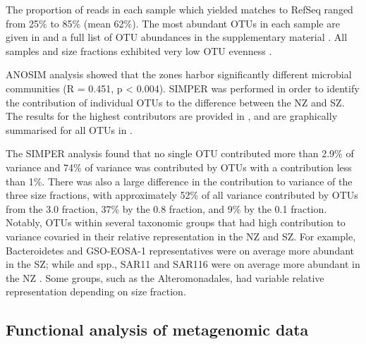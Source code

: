 The proportion of reads in each sample which yielded matches to RefSeq ranged from 25\% to 85\% (mean 62\%).
The most abundant \acp{OTU} in each sample are given in  and a full list of \ac{OTU} abundances in the supplementary material .
All samples and size fractions exhibited very low \ac{OTU} evenness .




\ac{ANOSIM} analysis showed that the zones harbor significantly different microbial communities (R = 0.451, p < 0.004). 
\ac{SIMPER} was performed in order to identify the contribution of individual \acp{OTU} to the difference between the \ac{NZ} and \ac{SZ}. 
The results for the highest contributors are provided in , and are graphically summarised for all \acp{OTU} in .




The \ac{SIMPER} analysis found that no single \ac{OTU} contributed more than 2.9\% of variance and 74\% of variance was contributed by \acp{OTU} with a contribution less than 1\%. 
There was also a large difference in the contribution to variance of the three size fractions, with approximately 52\% of all variance contributed by \acp{OTU} from the 3.0 \micron{} fraction, 37\% by the 0.8 \micron{} fraction, and 9\% by the 0.1 \micron{} fraction.
Notably, \acp{OTU} within several taxonomic groups that had high contribution to variance covaried in their relative representation in the \ac{NZ} and \ac{SZ}.
For example, Bacteroidetes and GSO-EOSA-1 representatives were on average more abundant in the \ac{SZ}; while  and  spp., SAR11 and SAR116 were on average more abundant in the \ac{NZ} .
Some groups, such as the Alteromonadales, had variable relative representation depending on size fraction.

\subsection{Functional analysis of metagenomic data}

